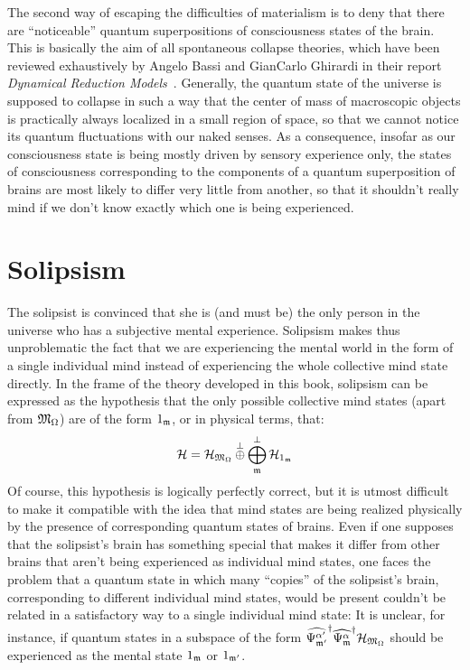 The second way of escaping the difficulties of materialism is to deny that there are ``noticeable'' quantum superpositions of consciousness states of the brain. This is basically the aim of all spontaneous collapse theories, which have been reviewed exhaustively by Angelo Bassi and GianCarlo Ghirardi in their report \textit{Dynamical Reduction Models}~\cite{Bassi2003}. Generally, the quantum state of the universe is supposed to collapse in such a way that the center of mass of macroscopic objects is practically always localized in a small region of space, so that we cannot notice its quantum fluctuations with our naked senses. As a consequence, insofar as our consciousness state is being mostly driven by sensory experience only, the states of consciousness corresponding to the components of a quantum superposition of brains are most likely to differ very little from another, so that it shouldn't really mind if we don't know exactly which one is being experienced.

\section{Solipsism}

The solipsist is convinced that she is (and must be) the only person in the universe who has a subjective mental experience. Solipsism makes thus unproblematic the fact that we are experiencing the mental world in the form of a single individual mind instead of experiencing the whole collective mind state directly. In the frame of the theory developed in this book, solipsism can be expressed as the hypothesis that the only possible collective mind states (apart from $\mathfrak{M}_\Omega$) are of the form ${1}_{\mathfrak{m}}$, or in physical terms, that:
\begin{equation*}
\mathcal H = \mathcal H_{\mathfrak{M}_\Omega} \overset{\perp}{\oplus} \bigoplus_{\mathfrak{m}}^\perp \mathcal H_{{1}_{\mathfrak{m}}}
\end{equation*}
Of course, this hypothesis is logically perfectly correct, but it is utmost difficult to make it compatible with the idea that mind states are being realized physically by the presence of corresponding quantum states of brains. Even if one supposes that the solipsist's brain has something special that makes it differ from other brains that aren't being experienced as individual mind states, one faces the problem that a quantum state in which many ``copies'' of the solipsist's brain, corresponding to different individual mind states, would be present couldn't be related in a satisfactory way to a single individual mind state: It is unclear, for instance, if quantum states in a subspace of the form $\widehat{\Psi_{\mathfrak{m}'}^{\alpha'}}^{\dagger} \widehat{\Psi_{\mathfrak{m}}^\alpha}^{\dagger} \mathcal H_{\mathfrak{M}_\Omega}$ should be experienced as the mental state ${1}_{\mathfrak{m}}$ or ${1}_{\mathfrak{m}'}$.

